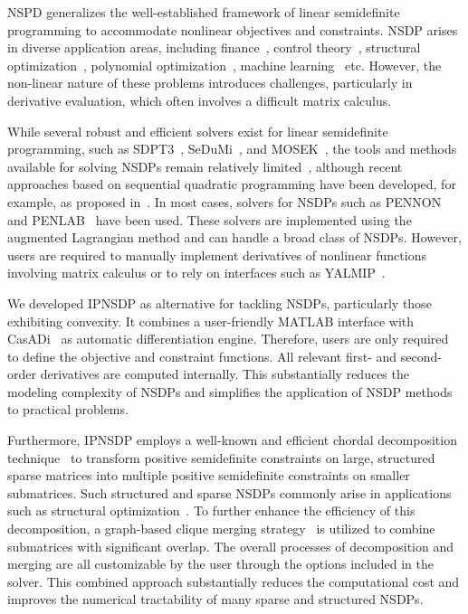 \documentclass[]{interact}
\theoremstyle{plain}%
\theoremstyle{definition}
\theoremstyle{remark}
\begin{document}
NSPD generalizes the well-established framework of linear semidefinite programming to accommodate nonlinear objectives and constraints. NSDP arises in diverse application areas, including finance~\cite{higham2002computing}, control theory~\cite{Kocvara_control}, structural optimization~\cite{Kocvara2002, Weldeyesus2024}, polynomial optimization~\cite{parrilo2003semidefinite}, machine learning~\cite{Konno2003} etc. However, the non-linear nature of these problems introduces challenges, particularly in derivative evaluation, which often involves a difficult matrix calculus.

While several robust and efficient solvers exist for linear semidefinite programming, such as SDPT3~\cite{TohToddTutuncu1999}, SeDuMi~\cite{Sturm1999}, and MOSEK~\cite{mosek},  the tools and methods available for solving NSDPs remain relatively limited~\cite{HiroshiYamashita2015}, although recent approaches based on sequential quadratic programming have been developed, for example, as proposed in~\cite{Kosuke2023}. In most cases, solvers for NSDPs such as PENNON~\cite{pennon} and PENLAB~\cite{penlab} have been used. These solvers are implemented using the augmented Lagrangian method and can handle a broad class of NSDPs. However, users are required to manually implement derivatives of nonlinear functions involving matrix calculus or to rely on interfaces such as YALMIP~\cite{yalmip}.

 We developed IPNSDP as alternative for tackling NSDPs, particularly those exhibiting convexity. It combines a user-friendly MATLAB interface with CasADi~\cite{Andersson2019} as automatic differentiation engine. Therefore, users are only required to define the objective and constraint functions. All relevant first- and second-order derivatives are computed internally. This substantially reduces the modeling complexity of NSDPs and simplifies the application of NSDP methods to practical problems.

Furthermore, IPNSDP employs a well-known and efficient chordal decomposition technique~\cite{Fukuda2001, KimKMY11, Lieven2015, ZHENG2021243} to transform positive semidefinite constraints on large, structured sparse matrices into multiple positive semidefinite constraints on smaller submatrices. Such structured and sparse NSDPs commonly arise in applications such as structural optimization~\cite{Kocvara21, Weldeyesus2024}. To further enhance the efficiency of this decomposition, a graph-based clique merging strategy~\cite{GARSTKA2020} is utilized to combine submatrices with significant overlap. The overall processes of decomposition and merging are all customizable by the user through the options included in the solver. This combined approach substantially reduces the computational cost  and improves the numerical tractability of many  sparse and structured NSDPs.
\end{document}
